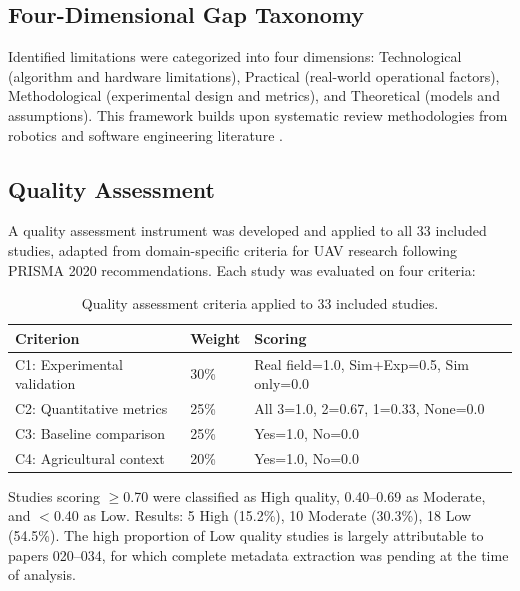 \documentclass[review, 12pt, times]{elsarticle}
\begin{document}
\subsection{Four-Dimensional Gap Taxonomy}

Identified limitations were categorized into four
dimensions: Technological (algorithm and hardware
limitations), Practical (real-world operational factors),
Methodological (experimental design and metrics), and
Theoretical (models and assumptions). This framework
builds upon systematic review methodologies from robotics
and software engineering literature
\cite{brambilla2013,bayindir2016}.

\subsection{Quality Assessment}

A quality assessment instrument was developed and applied
to all 33 included studies, adapted from domain-specific
criteria for UAV research following PRISMA 2020
recommendations. Each study was evaluated on four criteria:

\begin{table}[htbp]
\centering
\caption{Quality assessment criteria applied to 33
included studies.}
\label{tab:quality_criteria}
\begin{tabularx}{\textwidth}{lXX}
\toprule
\textbf{Criterion} & \textbf{Weight} & \textbf{Scoring} \\
\midrule
C1: Experimental validation & 30\% & Real field=1.0,
Sim+Exp=0.5, Sim only=0.0 \\
C2: Quantitative metrics & 25\% & All 3=1.0, 2=0.67,
1=0.33, None=0.0 \\
C3: Baseline comparison & 25\% & Yes=1.0, No=0.0 \\
C4: Agricultural context & 20\% & Yes=1.0, No=0.0 \\
\bottomrule
\end{tabularx}
\end{table}

Studies scoring $\geq$0.70 were classified as High quality,
0.40--0.69 as Moderate, and $<$0.40 as Low. Results: 5 High
(15.2\%), 10 Moderate (30.3\%), 18 Low (54.5\%). The high
proportion of Low quality studies is largely attributable
to papers 020--034, for which complete metadata extraction
was pending at the time of analysis.

\end{document}
